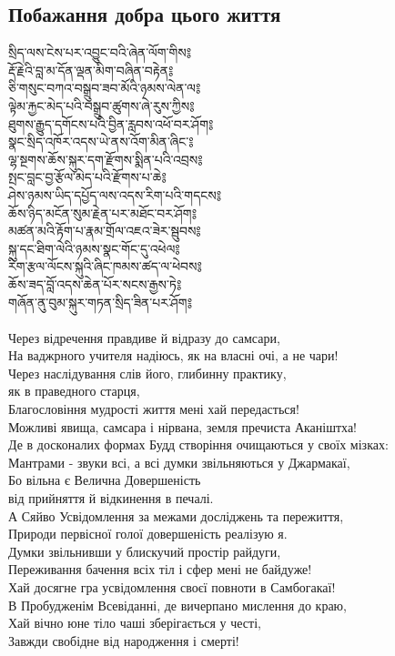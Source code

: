\subsection{Побажання добра цього життя}
\ti
སྲིད་ལས་ངེས་པར་འབྱུང་བའི་ཞེན་ལོག་གིས༔\\
རྡོ་རྗེའི་བླ་མ་དོན་ལྡན་མིག་བཞིན་བརྟེན༔\\
ཅི་གསུང་བཀའ་བསྒྲུབ་ཟབ་མོའི་ཉམས་ལེན་ལ༔\\
ལྟེམ་རྐྱང་མེད་པའི་བསྒྲུབ་ཚུགས་ཞེ་རུས་ཀྱིས༔\\
ཐུགས་རྒྱུད་དགོངས་པའི་བྱིན་རླབས་འཕོ་བར་ཤོག༔\\
སྣང་སྲིད་འཁོར་འདས་ཡེ་ནས་འོག་མིན་ཞིང་༔\\
ལྷ་སྔགས་ཆོས་སྐུར་དག་རྫོགས་སྨིན་པའི་འབྲས༔\\
སྤང་བླང་བྱ་རྩོལ་མེད་པའི་རྫོགས་པ་ཆེ༔\\
ཤེས་ཉམས་ཡིད་དཔྱོད་ལས་འདས་རིག་པའི་གདངས༔\\
ཆོས་ཉིད་མངོན་སུམ་རྗེན་པར་མཐོང་བར་ཤོག༔\\
མཚན་མའི་རྟོག་པ་རྣམ་གྲོལ་འཇའ་ཟེར་སྦུབས༔\\
སྐུ་དང་ཐིག་ལེའི་ཉམས་སྣང་གོང་དུ་འཕེལ༔\\
རིག་རྩལ་ལོངས་སྐུའི་ཞིང་ཁམས་ཚད་ལ་ཕེབས༔\\
ཆོས་ཟད་བློ་འདས་ཆེན་པོར་སངས་རྒྱས་ཏེ༔\\
གཞོན་ནུ་བུམ་སྐུར་གཏན་སྲིད་ཟིན་པར་ཤོག༔\\
\\
\ru
Через відречення правдиве й відразу до самсари,\\
На ваджрного учителя надіюсь, як на власні очі, а не чари!\\
Через наслідування слів його, глибинну практику, \\
\indent як в праведного старця,\\
Благословіння мудрості життя мені хай передасться!\\
Можливі явища, самсара і нірвана, земля пречиста Аканіштха!\\
Де в досконалих формах Будд створіння очищаються у своїх мізках:\\
Мантрами - звуки всі, а всі думки звільняються у Джармакаї,\\
Бо вільна є Велична Довершеність \\
\indent від прийняття й відкинення в печалі.\\
А Сяйво Усвідомлення за межами досліджень та пережиття,\\
Природи первісної голої довершеність реалізую я.\\
Думки звільнивши у блискучий простір райдуги,\\
Переживання бачення всіх тіл і сфер мені не байдуже!\\
Хай досягне гра усвідомлення своєї повноти в Самбогакаї!\\
В Пробудженім Всевіданні, де вичерпано мислення до краю,\\
Хай вічно юне тіло чаші зберігається у честі,\\
Завжди свобідне від народження і смерті!\\


